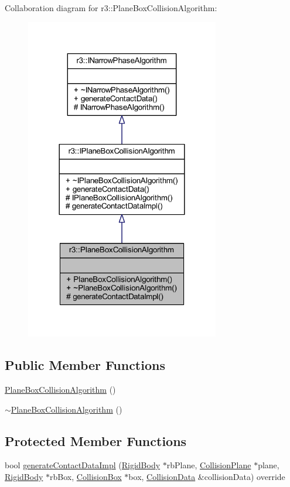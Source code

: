 Collaboration diagram for r3\+:\+:Plane\+Box\+Collision\+Algorithm\+:\nopagebreak
\begin{figure}[H]
\begin{center}
\leavevmode
\includegraphics[width=240pt]{classr3_1_1_plane_box_collision_algorithm__coll__graph}
\end{center}
\end{figure}
\subsection*{Public Member Functions}
\begin{DoxyCompactItemize}
\item 
\mbox{\hyperlink{classr3_1_1_plane_box_collision_algorithm_af949a76b7aa24fc9d620798b7c00f279}{Plane\+Box\+Collision\+Algorithm}} ()
\item 
\mbox{\hyperlink{classr3_1_1_plane_box_collision_algorithm_a8a59acc6292f6d1234c45cd85ddde98b}{$\sim$\+Plane\+Box\+Collision\+Algorithm}} ()
\end{DoxyCompactItemize}
\subsection*{Protected Member Functions}
\begin{DoxyCompactItemize}
\item 
bool \mbox{\hyperlink{classr3_1_1_plane_box_collision_algorithm_a529c85973e9dab38e7427cdf9177d9ba}{generate\+Contact\+Data\+Impl}} (\mbox{\hyperlink{classr3_1_1_rigid_body}{Rigid\+Body}} $\ast$rb\+Plane, \mbox{\hyperlink{classr3_1_1_collision_plane}{Collision\+Plane}} $\ast$plane, \mbox{\hyperlink{classr3_1_1_rigid_body}{Rigid\+Body}} $\ast$rb\+Box, \mbox{\hyperlink{classr3_1_1_collision_box}{Collision\+Box}} $\ast$box, \mbox{\hyperlink{classr3_1_1_collision_data}{Collision\+Data}} \&collision\+Data) override
\end{DoxyCompactItemize}


